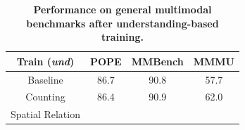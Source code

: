 \begin{table}[t]
    \centering
    \setlength{\tabcolsep}{6pt}
    \begin{tabular}{c|ccc}
        \toprule
        \textbf{Train (\textit{und})} 
        & \textbf{POPE}
        & \textbf{MMBench}
        & \textbf{MMMU}
        \\
        \midrule
        Baseline
        & 86.7 & 90.8 & 57.7 \\
        Counting & 86.4 & 90.9 & 62.0 \\
        Spatial Relation &  &  &  \\
        \bottomrule
    \end{tabular}
    \vspace{6pt}
    \caption{\textbf{Performance on general multimodal benchmarks after understanding-based training.}}
    \label{tab:general_bench}
\end{table}